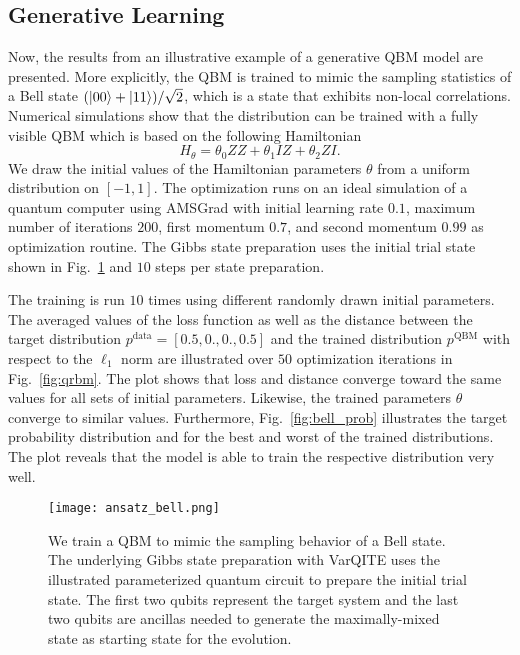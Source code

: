 \documentclass[twocolumn, aps, pra, superscriptaddress, floatfix]{revtex4}
\begin{document}
\subsection{Generative Learning}
\label{subsec:generative}

Now, the results from an illustrative example of a generative QBM model are presented.
More explicitly, the QBM is trained to mimic the sampling statistics of a Bell state $(\ket{00} + \ket{11})/\sqrt{2}$, which is a state that exhibits non-local correlations.
Numerical simulations show that the distribution can be trained with a fully visible QBM which is based on the following Hamiltonian
\begin{equation*}
	H_{\theta}= \theta_0 ZZ + \theta_1 IZ + \theta_2 ZI.
\end{equation*}
We draw the initial values of the Hamiltonian parameters $\theta$ from a uniform distribution on $\left[-1, 1\right]$.
The optimization runs on an ideal simulation of a quantum computer using AMSGrad \cite{amsgrad} with initial learning rate $0.1$, maximum number of iterations $200$, first momentum $0.7$, and second momentum $0.99$ as optimization routine.
The Gibbs state preparation uses the initial trial state shown in Fig.~\ref{fig:ansatz_Bell} and $10$ steps per state preparation.

The training is run $10$ times using different randomly drawn initial parameters.
The averaged values of the loss function as well as the distance between the target distribution $p^{\text{data}}=\left[0.5, 0., 0., 0.5\right]$ and the trained distribution $p^{\text{QBM}}$ with respect to the $\ell_1$ norm are illustrated over $50$ optimization iterations in Fig.~\ref{fig:qrbm}. 
The plot shows that loss and distance converge toward the same values for all sets of initial parameters. Likewise, the trained parameters $\theta$ converge to similar values.
Furthermore, Fig.~\ref{fig:bell_prob} illustrates the target probability distribution and for the best and worst of the trained distributions. The plot reveals that the model is able to train the respective distribution very well.

 \begin{figure}[h!]
\captionsetup{singlelinecheck = false, format= hang, justification=raggedright, font=footnotesize, labelsep=space}
\begin{center}
\texttt{[image: ansatz\_bell.png]}
\end{center}
\caption{We train a QBM to mimic the sampling behavior of a Bell state. 
The underlying Gibbs state preparation with VarQITE uses the illustrated parameterized quantum circuit to prepare the initial trial state. The first two qubits represent the target system and the last two qubits are ancillas needed to generate the maximally-mixed state as starting state for the evolution.}
\label{fig:ansatz_Bell}
\end{figure}
\end{document}

